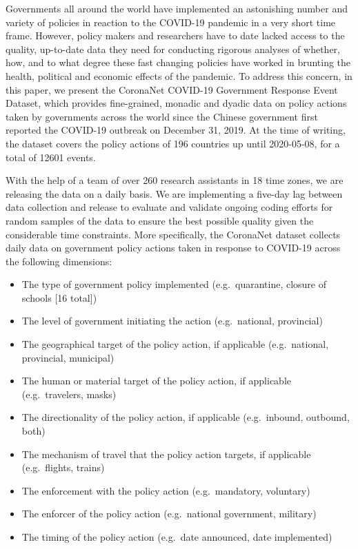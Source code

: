 \documentclass[]{article}
\providecommand{\tightlist}{%
  \setlength{\itemsep}{0pt}\setlength{\parskip}{0pt}}
\begin{document}
Governments all around the world have implemented an astonishing number and variety of policies in reaction to the COVID-19 pandemic in a very short time frame. However, policy makers and researchers have to date lacked access to the quality, up-to-date data they need for conducting rigorous analyses of whether, how, and to what degree these fast changing policies have worked in brunting the health, political and economic effects of the pandemic. To address this concern, in this paper, we present the CoronaNet COVID-19 Government Response Event Dataset, which provides fine-grained, monadic and dyadic data on policy actions taken by governments across the world since the Chinese government first reported the COVID-19 outbreak on December 31, 2019. At the time of writing, the dataset covers the policy actions of 196 countries up until 2020-05-08, for a total of 12601 events.

With the help of a team of over 260 research assistants in 18 time zones, we are releasing the data on a daily basis. We are implementing a five-day lag between data collection and release to evaluate and validate ongoing coding efforts for random samples of the data to ensure the best possible quality given the considerable time constraints. More specifically, the CoronaNet dataset collects daily data on government policy actions taken in response to COVID-19 across the following dimensions:

\begin{itemize}
\tightlist
\item
  The type of government policy implemented (e.g.~quarantine, closure of schools {[}16 total{]})
\item
  The level of government initiating the action (e.g.~national, provincial)
\item
  The geographical target of the policy action, if applicable (e.g.~national, provincial, municipal)
\item
  The human or material target of the policy action, if applicable (e.g.~travelers, masks)
\item
  The directionality of the policy action, if applicable (e.g.~inbound, outbound, both)
\item
  The mechanism of travel that the policy action targets, if applicable (e.g.~flights, trains)
\item
  The enforcement with the policy action (e.g.~mandatory, voluntary)
\item
  The enforcer of the policy action (e.g.~national government, military)
\item
  The timing of the policy action (e.g.~date announced, date implemented)
\end{itemize}
\end{document}
